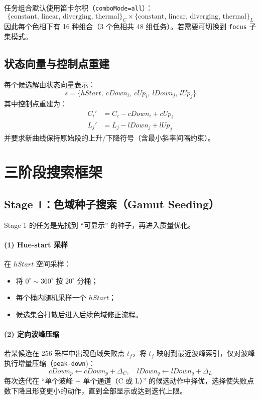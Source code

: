 \documentclass[UTF8,fontset=fandol]{ctexart}
\begin{document}
任务组合默认使用笛卡尔积（\texttt{comboMode=all}）：
\begin{equation}
\{\text{constant, linear, diverging, thermal}\}_{C}
\times
\{\text{constant, linear, diverging, thermal}\}_{L}
\end{equation}
因此每个色相下有 16 种组合（3 个色相共 48 组任务）。若需要可切换到 \texttt{focus} 子集模式。

\subsection{状态向量与控制点重建}
每个候选解由状态向量表示：
\[
s=\{hStart,\ cDown_i,\ cUp_i,\ lDown_j,\ lUp_j\}
\]
其中控制点重建为：
\begin{align}
C_i' &= C_i - cDown_i + cUp_i \\
L_j' &= L_j - lDown_j + lUp_j
\end{align}
并要求新曲线保持原始段的上升/下降符号（含最小斜率间隔约束）。

\section{三阶段搜索框架}
\subsection{Stage 1：色域种子搜索（Gamut Seeding）}
Stage 1 的任务是先找到 ``可显示'' 的种子，再进入质量优化。

\paragraph{(1) Hue-start 采样}
在 \(hStart\) 空间采样：
\begin{itemize}
    \item 将 \(0^\circ \sim 360^\circ\) 按 \(20^\circ\) 分桶；
    \item 每个桶内随机采样一个 \(hStart\)；
    \item 候选集合打散后进入后续色域修正流程。
\end{itemize}

\paragraph{(2) 定向波峰压缩}
若某候选在 256 采样中出现色域失败点 \(t_f\)，将 \(t_f\) 映射到最近波峰索引，仅对波峰执行增量压缩（\texttt{peak-down})：
\begin{equation}
cDown_p \leftarrow cDown_p + \Delta_C,\quad lDown_q \leftarrow lDown_q + \Delta_L
\end{equation}
每次迭代在 ``单个波峰 + 单个通道（C 或 L）'' 的候选动作中择优，选择使失败点数下降且形变更小的动作，直到全部显示或达到迭代上限。
\end{document}
